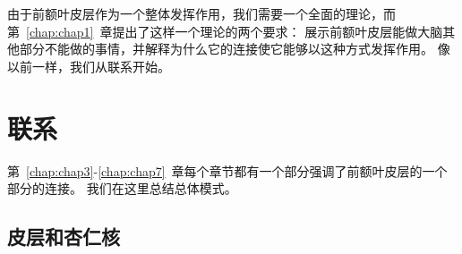 由于前额叶皮层作为一个整体发挥作用，我们需要一个全面的理论，而第~\ref{chap:chap1}~章提出了这样一个理论的两个要求：
展示前额叶皮层能做大脑其他部分不能做的事情，并解释为什么它的连接使它能够以这种方式发挥作用。
像以前一样，我们从联系开始。



\section{联系}
\par
第~\ref{chap:chap3}-\ref{chap:chap7}~章每个章节都有一个部分强调了前额叶皮层的一个部分的连接。
我们在这里总结总体模式。



\subsection{皮层和杏仁核}

